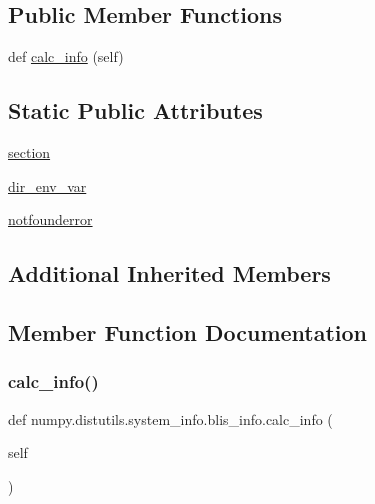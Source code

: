 \subsection*{Public Member Functions}
\begin{DoxyCompactItemize}
\item 
def \hyperlink{classnumpy_1_1distutils_1_1system__info_1_1blis__info_aca08c1255f8608ddbd92870c6b1f902a}{calc\+\_\+info} (self)
\end{DoxyCompactItemize}
\subsection*{Static Public Attributes}
\begin{DoxyCompactItemize}
\item 
\hyperlink{classnumpy_1_1distutils_1_1system__info_1_1blis__info_a8ec9279e0889960fab9339e87430a000}{section}
\item 
\hyperlink{classnumpy_1_1distutils_1_1system__info_1_1blis__info_a1ae732415bc05fbcfde83a9e74f1aa7e}{dir\+\_\+env\+\_\+var}
\item 
\hyperlink{classnumpy_1_1distutils_1_1system__info_1_1blis__info_aa406b882cafbaa673ab4f394865333b5}{notfounderror}
\end{DoxyCompactItemize}
\subsection*{Additional Inherited Members}


\subsection{Member Function Documentation}
\mbox{\label{classnumpy_1_1distutils_1_1system__info_1_1blis__info_aca08c1255f8608ddbd92870c6b1f902a}} 
\subsubsection{\texorpdfstring{calc\+\_\+info()}{calc\_info()}}
{\footnotesize\ttfamily def numpy.\+distutils.\+system\+\_\+info.\+blis\+\_\+info.\+calc\+\_\+info (\begin{DoxyParamCaption}\item[{}]{self }\end{DoxyParamCaption})}



